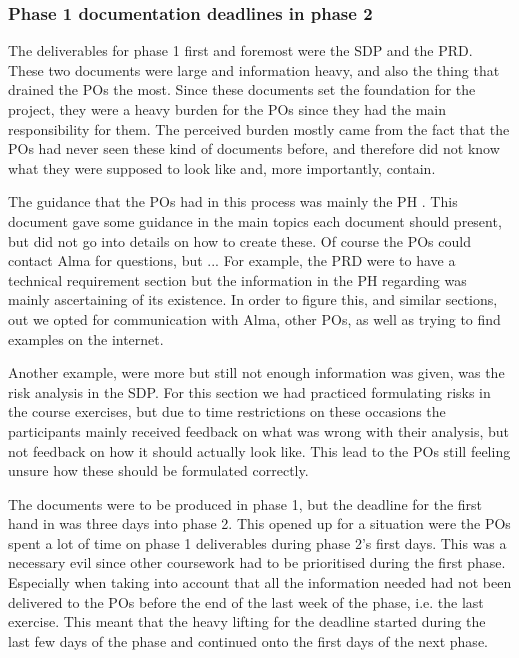 \documentclass{article}
\begin{document}
\subsubsection{Phase 1 documentation deadlines in phase 2}
The deliverables for phase 1 first and foremost were the SDP and the PRD. These two documents were large and information heavy, and also the thing that drained the POs the most. Since these documents set the foundation for the project, they were a heavy burden for the POs since they had the main responsibility for them. The perceived burden mostly came from the fact that the POs had never seen these kind of documents before, and therefore did not know what they were supposed to look like and, more importantly, contain. 

The guidance that the POs had in this process was mainly the PH \cite{PH}. This document gave some guidance in the main topics each document should present, but did not go into details on how to create these. Of course the POs could contact Alma for questions, but ...
For example, the PRD were to have a technical requirement section but the information in the PH regarding was mainly ascertaining of its existence. In order to figure this, and similar sections, out we opted for communication with Alma, other POs, as well as trying to find examples on the internet. 

Another example, were more but still not enough information was given, was the risk analysis in the SDP. For this section we had practiced formulating risks in the course exercises, but due to time restrictions on these occasions the participants mainly received feedback on what was wrong with their analysis, but not feedback on how it should actually look like. This lead to the POs still feeling unsure how these should be formulated correctly. 

The documents were to be produced in phase 1, but the deadline for the first hand in was three days into phase 2. This opened up for a situation were the POs spent a lot of time on phase 1 deliverables during phase 2's first days. This was a necessary evil since other coursework had to be prioritised during the first phase. Especially when taking into account that all the information needed had not been delivered to the POs before the end of the last week of the phase, i.e. the last exercise. This meant that the heavy lifting for the deadline started during the last few days of the phase and continued onto the first days of the next phase. 
\end{document}
